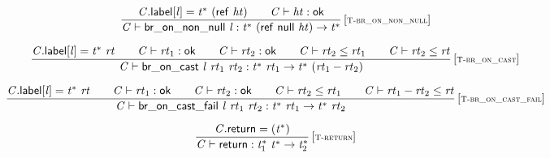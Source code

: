 $$
\begin{array}{@{}c@{}}\displaystyle
\frac{
{\mathit{C}}.\mathsf{label}{}[{\mathit{l}}] = {{\mathit{t}}^\ast}~(\mathsf{ref}~{\mathit{ht}})
 \qquad
{\mathit{C}} \vdash {\mathit{ht}} : \mathsf{ok}
}{
{\mathit{C}} \vdash \mathsf{br\_on\_non\_null}~{\mathit{l}} : {{\mathit{t}}^\ast}~(\mathsf{ref}~\mathsf{null}~{\mathit{ht}}) \rightarrow {{\mathit{t}}^\ast}
} \, {[\textsc{\scriptsize T{-}br\_on\_non\_null}]}
\qquad
\end{array}
$$

$$
\begin{array}{@{}c@{}}\displaystyle
\frac{
{\mathit{C}}.\mathsf{label}{}[{\mathit{l}}] = {{\mathit{t}}^\ast}~{\mathit{rt}}
 \qquad
{\mathit{C}} \vdash {\mathit{rt}}_{{1}} : \mathsf{ok}
 \qquad
{\mathit{C}} \vdash {\mathit{rt}}_{{2}} : \mathsf{ok}
 \qquad
{\mathit{C}} \vdash {\mathit{rt}}_{{2}} \leq {\mathit{rt}}_{{1}}
 \qquad
{\mathit{C}} \vdash {\mathit{rt}}_{{2}} \leq {\mathit{rt}}
}{
{\mathit{C}} \vdash \mathsf{br\_on\_cast}~{\mathit{l}}~{\mathit{rt}}_{{1}}~{\mathit{rt}}_{{2}} : {{\mathit{t}}^\ast}~{\mathit{rt}}_{{1}} \rightarrow {{\mathit{t}}^\ast}~({\mathit{rt}}_{{1}} - {\mathit{rt}}_{{2}})
} \, {[\textsc{\scriptsize T{-}br\_on\_cast}]}
\qquad
\end{array}
$$

$$
\begin{array}{@{}c@{}}\displaystyle
\frac{
{\mathit{C}}.\mathsf{label}{}[{\mathit{l}}] = {{\mathit{t}}^\ast}~{\mathit{rt}}
 \qquad
{\mathit{C}} \vdash {\mathit{rt}}_{{1}} : \mathsf{ok}
 \qquad
{\mathit{C}} \vdash {\mathit{rt}}_{{2}} : \mathsf{ok}
 \qquad
{\mathit{C}} \vdash {\mathit{rt}}_{{2}} \leq {\mathit{rt}}_{{1}}
 \qquad
{\mathit{C}} \vdash {\mathit{rt}}_{{1}} - {\mathit{rt}}_{{2}} \leq {\mathit{rt}}
}{
{\mathit{C}} \vdash \mathsf{br\_on\_cast\_fail}~{\mathit{l}}~{\mathit{rt}}_{{1}}~{\mathit{rt}}_{{2}} : {{\mathit{t}}^\ast}~{\mathit{rt}}_{{1}} \rightarrow {{\mathit{t}}^\ast}~{\mathit{rt}}_{{2}}
} \, {[\textsc{\scriptsize T{-}br\_on\_cast\_fail}]}
\qquad
\end{array}
$$

\vspace{1ex}

$$
\begin{array}{@{}c@{}}\displaystyle
\frac{
{\mathit{C}}.\mathsf{return} = ({{\mathit{t}}^\ast})
}{
{\mathit{C}} \vdash \mathsf{return} : {{\mathit{t}}_{{1}}^\ast}~{{\mathit{t}}^\ast} \rightarrow {{\mathit{t}}_{{2}}^\ast}
} \, {[\textsc{\scriptsize T{-}return}]}
\qquad
\end{array}
$$

